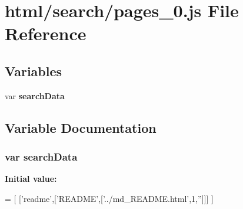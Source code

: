 \section{html/search/pages\-\_\-0.js File Reference}
\label{pages__0_8js}
\subsection*{Variables}
\begin{DoxyCompactItemize}
\item 
var {\bf search\-Data}
\end{DoxyCompactItemize}


\subsection{Variable Documentation}
\subsubsection[{search\-Data}]{\setlength{\rightskip}{0pt plus 5cm}var search\-Data}\label{pages__0_8js_ad01a7523f103d6242ef9b0451861231e}
{\bfseries Initial value\-:}
\begin{DoxyCode}
=
[
  [\textcolor{stringliteral}{'readme'},[\textcolor{stringliteral}{'README'},[\textcolor{stringliteral}{'../md\_README.html'},1,\textcolor{stringliteral}{''}]]]
]
\end{DoxyCode}

